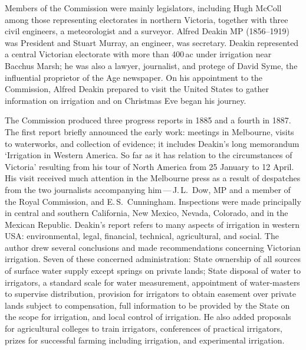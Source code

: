 Members of the Commission were mainly legislators, including Hugh
McColl among those representing electorates in northern Victoria,
together with three civil engineers, a meteorologist and a surveyor.
Alfred Deakin MP (1856--1919) was President and Stuart Murray,
 an
engineer, was secretary.  Deakin represented a central Victorian
electorate with more than 400\,ac under irrigation near Bacchus Marsh;
he was also a lawyer, journalist, and protege of David Syme,
 the
influential proprietor of the Age newspaper.  On his appointment to
the Commission, Alfred Deakin prepared to visit the United States
 to
gather information on irrigation and on Christmas Eve began his
journey.

The Commission produced three progress reports in 1885 and a fourth in
1887.  The first report briefly announced the early work: meetings in
Melbourne, visits to waterworks, and collection of evidence; it
includes Deakin's  long memorandum `Irrigation in
Western America. So far as it has relation to the circumstances of
Victoria' resulting from his tour of North America from 25 January to
12 April.  His visit received much attention in the Melbourne press as
a result of despatches from the two journalists accompanying
him\,---\,J.\,L.~Dow,
 MP
and a member of the Royal Commission, and
E.\,S.~Cunningham.   Inspections were made
principally in central and southern California, New Mexico, Nevada,
Colorado, and in the Mexican Republic.  Deakin's report
refers to many aspects of irrigation in western USA: environmental,
legal, financial, technical, agricultural, and social.  The author
drew several conclusions and made recommendations concerning Victorian
irrigation.  Seven of these concerned administration: State ownership
of all sources of surface water supply except springs on private
lands; State disposal of water to irrigators, a standard scale for
water measurement, appointment of water-masters to supervise
distribution, provision for irrigators to obtain easement over private
lands subject to compensation, full information to be provided by the
State on the scope for irrigation, and local control of irrigation.
He also added proposals for agricultural colleges to train irrigators,
conferences of practical irrigators, prizes for successful farming
including irrigation, and experimental irrigation.

